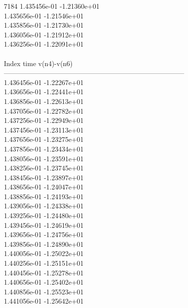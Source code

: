 7184	1.435456e-01	-1.21360e+01	\\ 	1.435656e-01	-1.21546e+01	\\ 	1.435856e-01	-1.21730e+01	\\ 	1.436056e-01	-1.21912e+01	\\ 	1.436256e-01	-1.22091e+01	\\ \hline
\\ \hline
Index   time            v(n4)-v(n6)     \\ \hline
--------------------------------------------------------------------------------\\ 	1.436456e-01	-1.22267e+01	\\ 	1.436656e-01	-1.22441e+01	\\ 	1.436856e-01	-1.22613e+01	\\ 	1.437056e-01	-1.22782e+01	\\ 	1.437256e-01	-1.22949e+01	\\ 	1.437456e-01	-1.23113e+01	\\ 	1.437656e-01	-1.23275e+01	\\ 	1.437856e-01	-1.23434e+01	\\ 	1.438056e-01	-1.23591e+01	\\ 	1.438256e-01	-1.23745e+01	\\ 	1.438456e-01	-1.23897e+01	\\ 	1.438656e-01	-1.24047e+01	\\ 	1.438856e-01	-1.24193e+01	\\ 	1.439056e-01	-1.24338e+01	\\ 	1.439256e-01	-1.24480e+01	\\ 	1.439456e-01	-1.24619e+01	\\ 	1.439656e-01	-1.24756e+01	\\ 	1.439856e-01	-1.24890e+01	\\ 	1.440056e-01	-1.25022e+01	\\ 	1.440256e-01	-1.25151e+01	\\ 	1.440456e-01	-1.25278e+01	\\ 	1.440656e-01	-1.25402e+01	\\ 	1.440856e-01	-1.25523e+01	\\ 	1.441056e-01	-1.25642e+01	\\ \hline
